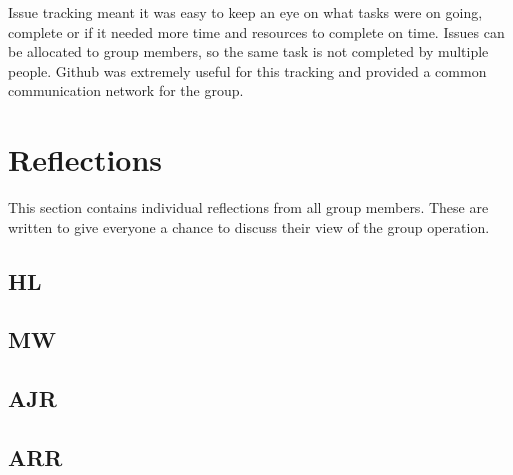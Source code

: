 Issue tracking meant it was easy to keep an eye on what tasks were on going, complete or if it needed more time and resources to complete on time.
Issues can be allocated to group members, so the same task is not completed by multiple people. 
Github was extremely useful for this tracking and provided a common communication network for the group. 


\section{Reflections}

This section contains individual reflections from all group members. 
These are written to give everyone a chance to discuss their view of the group operation. 


\subsection{HL}

\subsection{MW}

\subsection{AJR}

\subsection{ARR}

